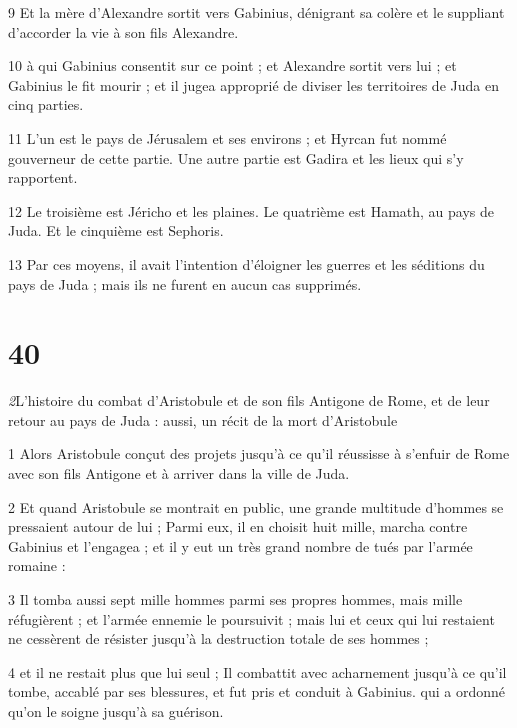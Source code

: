 \par 9 Et la mère d'Alexandre sortit vers Gabinius, dénigrant sa colère et le suppliant d'accorder la vie à son fils Alexandre.

\par 10 à qui Gabinius consentit sur ce point ; et Alexandre sortit vers lui ; et Gabinius le fit mourir ; et il jugea approprié de diviser les territoires de Juda en cinq parties.

\par 11 L'un est le pays de Jérusalem et ses environs ; et Hyrcan fut nommé gouverneur de cette partie. Une autre partie est Gadira et les lieux qui s'y rapportent.

\par 12 Le troisième est Jéricho et les plaines. Le quatrième est Hamath, au pays de Juda. Et le cinquième est Sephoris.

\par 13 Par ces moyens, il avait l'intention d'éloigner les guerres et les séditions du pays de Juda ; mais ils ne furent en aucun cas supprimés.

\chapter{40}

\par \textit2{L'histoire du combat d'Aristobule et de son fils Antigone de Rome, et de leur retour au pays de Juda : aussi, un récit de la mort d'Aristobule}

\par 1 Alors Aristobule conçut des projets jusqu'à ce qu'il réussisse à s'enfuir de Rome avec son fils Antigone et à arriver dans la ville de Juda.

\par 2 Et quand Aristobule se montrait en public, une grande multitude d'hommes se pressaient autour de lui ; Parmi eux, il en choisit huit mille, marcha contre Gabinius et l'engagea ; et il y eut un très grand nombre de tués par l'armée romaine :

\par 3 Il tomba aussi sept mille hommes parmi ses propres hommes, mais mille réfugièrent ; et l'armée ennemie le poursuivit ; mais lui et ceux qui lui restaient ne cessèrent de résister jusqu'à la destruction totale de ses hommes ;

\par 4 et il ne restait plus que lui seul ; Il combattit avec acharnement jusqu'à ce qu'il tombe, accablé par ses blessures, et fut pris et conduit à Gabinius. qui a ordonné qu'on le soigne jusqu'à sa guérison.

